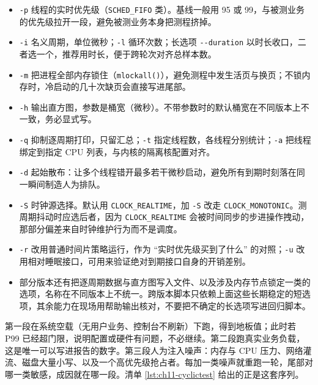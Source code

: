 \documentclass[12pt,a4paper,fontset=fandol]{ctexbook}
\newcommand{\Fn}[1]{\texttt{#1()}}
\newcommand{\Tp}[1]{\texttt{#1}}
\newcommand{\Opt}[1]{\texttt{-\/-#1}}
\begin{document}
\begin{itemize}
  \item \Tp{-p} 线程的实时优先级（\Tp{SCHED\_FIFO} 类）。基线一般用 95 或 99，与被测业务的优先级拉开一段，避免被测业务本身把测程挤掉。
  \item \Tp{-i} 名义周期，单位微秒；\Tp{-l} 循环次数；长选项 \Opt{duration} 以时长收口，二者选一个，推荐用时长，便于跨轮次对齐总样本数。
  \item \Tp{-m} 把进程全部内存锁住（\Fn{mlockall}），避免测程中发生活页与换页；不锁内存时，冷启动的几十次缺页会直接写进尾部。
  \item \Tp{-h} 输出直方图，参数是桶宽（微秒）。不带参数时的默认桶宽在不同版本上不一致，务必显式写。
  \item \Tp{-q} 抑制逐周期打印，只留汇总；\Tp{-t} 指定线程数，各线程分别统计；\Tp{-a} 把线程绑定到指定 CPU 列表，与内核的隔离核配置对齐。
  \item \Tp{-d} 起始散布：让多个线程错开最多若干微秒启动，避免所有到期时刻落在同一瞬间制造人为排队。
  \item \Tp{-S} 时钟源选择。默认用 \Tp{CLOCK\_REALTIME}，加 \Tp{-S} 改走 \Tp{CLOCK\_MONOTONIC}。测周期抖动时应选后者，因为 \Tp{CLOCK\_REALTIME} 会被时间同步的步进操作拽动，那部分偏差来自时钟维护行为而不是调度。
  \item \Tp{-r} 改用普通时间片策略运行，作为 ``实时优先级买到了什么'' 的对照；\Tp{-u} 改用相对睡眠接口，可用来验证绝对到期接口自身的开销差别。
  \item 部分版本还有把逐周期数据与直方图写入文件、以及涉及内存节点锁定一类的选项，名称在不同版本上不统一。跨版本脚本只依赖上面这些长期稳定的短选项，其余能力在现场用帮助输出核对，不要把不确定的长选项写进回归脚本。
\end{itemize}

\begin{bestpractice}[title={基线跑法：空载、加压、注入噪声三段}]
第一段在系统空载（无用户业务、控制台不刷新）下跑，得到地板值；此时若 P99 已经超门限，说明配置或硬件有问题，不必继续。第二段跑真实业务负载，这是唯一可以写进报告的数字。第三段人为注入噪声：内存与 CPU 压力、网络灌流、磁盘大量小写、以及一个高优先级抢占者。每加一类噪声就重跑一轮，尾部对哪一类敏感，成因就在哪一段。清单 \ref{lst:ch11-cyclictest} 给出的正是这套序列。
\end{bestpractice}
\end{document}

